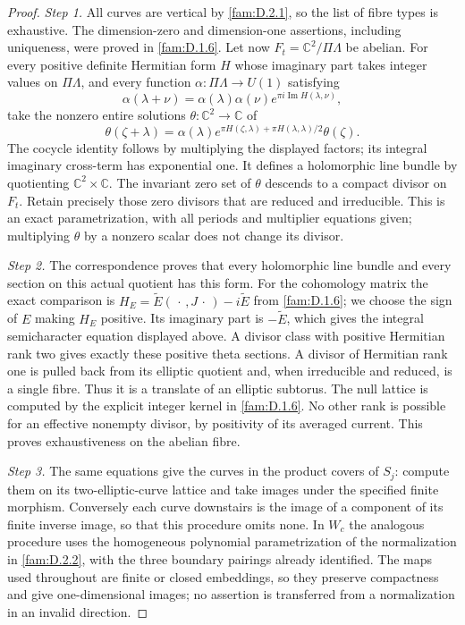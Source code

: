 \documentclass[11pt,a4paper]{article}
\theoremstyle{plain}
\theoremstyle{definition}
\begin{document}
\begin{proof}
\par\noindent\textit{Step 1.} All curves are vertical by \ref{fam:D.2.1}, so the list of fibre types is exhaustive.
The dimension-zero and dimension-one assertions, including uniqueness,
were proved in \ref{fam:D.1.6}. Let now $F_t=\mathbb C^2/\Pi\Lambda$ be abelian.
For every positive definite Hermitian form $H$ whose imaginary part takes
integer values on $\Pi\Lambda$, and every function
$\alpha:\Pi\Lambda\to U(1)$ satisfying
\[
 \alpha(\lambda+\nu)=\alpha(\lambda)\alpha(\nu)
                 e^{\pi i\operatorname{Im}H(\lambda,\nu)},
\]
take the nonzero entire solutions $\theta:\mathbb C^2\to\mathbb C$ of
\begin{equation}\label{fam:eq:cd-theta-sections}
 \theta(\zeta+\lambda)=\alpha(\lambda)
 e^{\pi H(\zeta,\lambda)+\pi H(\lambda,\lambda)/2}\theta(\zeta).
\end{equation}
The cocycle identity follows by multiplying the displayed factors; its
integral imaginary cross-term has exponential one. It defines a
holomorphic line bundle by quotienting $\mathbb C^2\times\mathbb C$.
The invariant zero set of $\theta$ descends to a compact divisor on
$F_t$. Retain precisely those zero divisors that are reduced and
irreducible. This is an exact parametrization, with all periods and
multiplier equations given; multiplying $\theta$ by a nonzero scalar
does not change its divisor.

\par\noindent\textit{Step 2.} The correspondence \cite[Theorem 4.1 and equation (4.3)]{Schnell19} proves
that every holomorphic line bundle and every section on this actual
quotient has this form. For the cohomology matrix the exact comparison is
$H_E=\widetilde E(\,\cdot\,,J\,\cdot\,)-i\widetilde E$ from \ref{fam:D.1.6};
we choose the sign of $E$ making $H_E$ positive. Its imaginary part is
$-\widetilde E$, which gives the integral semicharacter equation displayed
above. A divisor class with positive Hermitian rank two gives exactly
these positive theta sections. A divisor of Hermitian rank one is pulled
back from its elliptic quotient and, when irreducible and reduced, is a
single fibre. Thus it is a translate of an elliptic subtorus. The null
lattice is computed by the explicit integer kernel in \ref{fam:D.1.6}. No other
rank is possible for an effective nonempty divisor, by positivity of its
averaged current. This proves exhaustiveness on the abelian fibre.

\par\noindent\textit{Step 3.} The same equations give the curves in the product covers of $S_j$:
compute them on its two-elliptic-curve lattice and take images under the
specified finite morphism. Conversely each curve downstairs is the image
of a component of its finite inverse image, so that this procedure omits
none. In $W_c$ the analogous procedure uses the homogeneous polynomial
parametrization of the normalization in \ref{fam:D.2.2}, with the three boundary
pairings already identified. The maps used throughout are finite or
closed embeddings, so they preserve compactness and give one-dimensional
images; no assertion is transferred from a normalization in an invalid
direction.
\end{proof}
\end{document}

